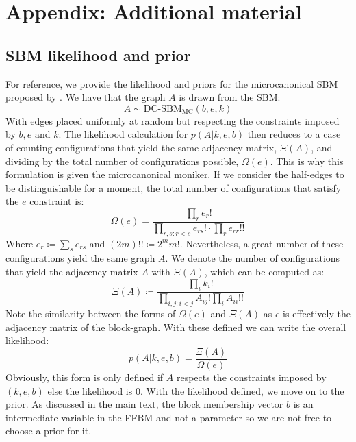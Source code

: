 \section{Appendix: Additional material}

\subsection{SBM likelihood and prior}
\label{appdx:sbm}

For reference, we provide the likelihood and priors for the microcanonical SBM proposed by \citet{Peixoto-Bayesian-Microcanonical}. We have that the graph $A$ is drawn from the SBM:
%
\begin{equation}
	A \sim \textrm{DC-SBM}_{\textrm{MC}}(b, e, k)
\end{equation}
%
With edges placed uniformly at random but respecting the constraints imposed by $b, e$ and $k$. The likelihood calculation for $p(A|k, e, b)$ then reduces to a case of counting configurations that yield the same adjacency matrix, $\Xi (A)$, and dividing by the total number of configurations possible, $\Omega(e)$. This is why this formulation is given the microcanonical moniker. If we consider the half-edges to be distinguishable for a moment, the total number of configurations that satisfy the $e$ constraint is:
%
\begin{equation}
	\Omega(e) = \frac{\prod_{r} e_r !}{\prod_{r,s : r < s} e_{rs}! \cdot \prod_{r} e_{rr}!!}
\end{equation}
%
Where $e_r \coloneqq \sum_{s} e_{rs}$ and $(2m)!! \coloneqq 2^m m!$. Nevertheless, a great number of these configurations yield the same graph $A$. We denote the number of configurations that yield the adjacency matrix $A$ with $\Xi(A)$, which can be computed as:
%
\begin{equation}
	\Xi(A) \coloneqq \frac{\prod_i k_i !}{\prod_{i,j : i < j} A_{ij} ! \prod_i A_{ii} !! }
\end{equation}
%
Note the similarity between the forms of $\Omega(e)$ and $\Xi(A)$ as $e$ is effectively the adjacency matrix of the block-graph. With these defined we can write the overall likelihood:
%
\begin{equation}
	p(A|k,e,b) = \frac{\Xi(A)}{\Omega(e)}
\end{equation}
%
Obviously, this form is only defined if $A$ respects the constraints imposed by $(k,e,b)$ else the likelihood is 0. With the likelihood defined, we move on to the prior. As discussed in the main text, the block membership vector $b$ is an intermediate variable in the FFBM and not a parameter so we are not free to choose a prior for it.

